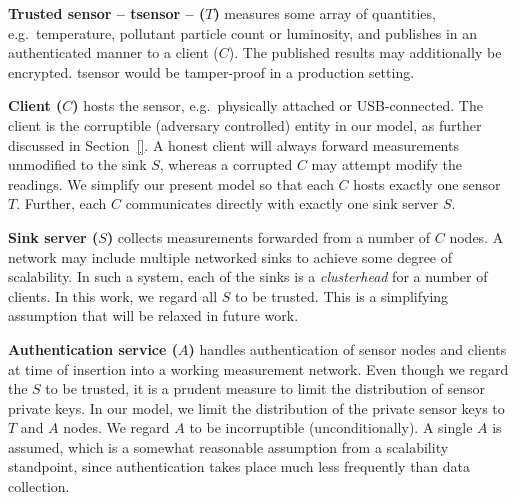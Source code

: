 \begin{description}
\item \textbf{Trusted sensor -- tsensor -- ($T$)} measures some array of quantities, e.g.\ temperature, pollutant particle count or luminosity, and publishes in an authenticated manner to a client ($C$). The published results may additionally be encrypted. tsensor would be tamper-proof in a production setting.
\item \textbf{Client ($C$)} hosts the sensor, e.g.\ physically attached or USB-connected. The client is the corruptible (adversary controlled) entity in our model, as further discussed in Section~\ref{}. A honest client will always forward measurements unmodified to the sink $S$, whereas a corrupted $C$ may attempt modify the readings. We simplify our present model so that each $C$ hosts exactly one sensor $T$. Further, each $C$ communicates directly with exactly one sink server $S$.
\item \textbf{Sink server ($S$)} collects measurements forwarded from a number of $C$ nodes. A network may include multiple networked sinks to achieve some degree of scalability. In such a system, each of the sinks is a \textit{clusterhead} for a number of clients. In this work, we regard all $S$ to be trusted. This is a simplifying assumption that will be relaxed in future work.
\item \textbf{Authentication service ($A$)} handles authentication of sensor nodes and clients at time of insertion into a working measurement network. Even though we regard the $S$ to be trusted, it is a prudent measure to limit the distribution of sensor private keys. In our model, we limit the distribution of the private sensor keys to $T$ and $A$ nodes. We regard $A$ to be incorruptible (unconditionally). A single $A$ is assumed, which is a somewhat reasonable assumption from a scalability standpoint, since authentication takes place much less frequently than data collection.
\end{description}

